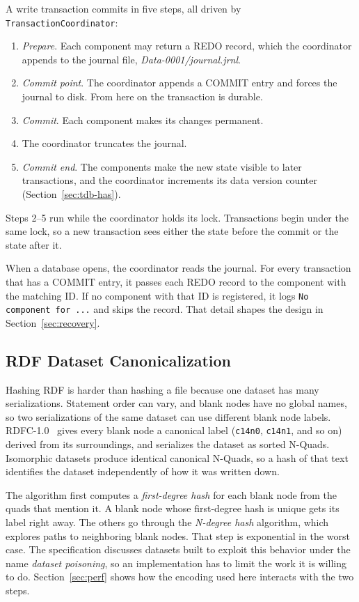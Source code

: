 \documentclass[11pt,a4paper]{article}
\newcommand{\code}[1]{\texttt{#1}}
\newcommand{\file}[1]{\textit{#1}}
\begin{document}
A write transaction commits in five steps, all driven by \code{TransactionCoordinator}:

\begin{enumerate}
\item \emph{Prepare}. Each component may return a REDO record, which the coordinator appends
  to the journal file, \file{Data-0001/journal.jrnl}.
\item \emph{Commit point}. The coordinator appends a COMMIT entry and forces the journal to
  disk. From here on the transaction is durable.
\item \emph{Commit}. Each component makes its changes permanent.
\item The coordinator truncates the journal.
\item \emph{Commit end}. The components make the new state visible to later transactions, and
  the coordinator increments its data version counter (Section~\ref{sec:tdb-has}).
\end{enumerate}

Steps 2--5 run while the coordinator holds its lock. Transactions begin under the same lock,
so a new transaction sees either the state before the commit or the state after it.

When a database opens, the coordinator reads the journal. For every transaction that has a
COMMIT entry, it passes each REDO record to the component with the matching ID. If no component
with that ID is registered, it logs \code{No component for ...} and skips the record. That
detail shapes the design in Section~\ref{sec:recovery}.

\subsection{RDF Dataset Canonicalization}
\label{sec:rdfc}

Hashing RDF is harder than hashing a file because one dataset has many serializations.
Statement order can vary, and blank nodes have no global names, so two serializations of the
same dataset can use different blank node labels. RDFC-1.0~\cite{rdfc} gives every blank node
a canonical label (\code{c14n0}, \code{c14n1}, and so on) derived from its surroundings, and
serializes the dataset as sorted N-Quads. Isomorphic datasets produce identical canonical
N-Quads, so a hash of that text identifies the dataset independently of how it was written
down.

The algorithm first computes a \emph{first-degree hash} for each blank node from the quads
that mention it. A blank node whose first-degree hash is unique gets its label right away. The
others go through the \emph{N-degree hash} algorithm, which explores paths to neighboring blank
nodes. That step is exponential in the worst case. The specification discusses datasets built
to exploit this behavior under the name \emph{dataset poisoning}, so an implementation has to
limit the work it is willing to do. Section~\ref{sec:perf} shows how the encoding used here
interacts with the two steps.
\end{document}
